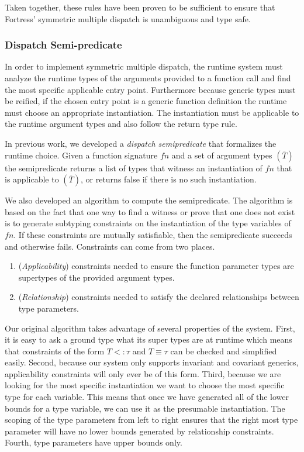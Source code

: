 \documentclass[preprint]{sigplanconf}
\begin{document}
Taken together, these rules have been proven to be sufficient to ensure that Fortress' symmetric multiple dispatch
is unambiguous and type safe.

\subsubsection{Dispatch Semi-predicate}
In order to implement symmetric multiple dispatch, the runtime system must analyze
the runtime types of the arguments provided to a function call and find the most
specific applicable entry point.  Furthermore because generic types must be reified, if the chosen entry point
is a generic function definition the runtime must choose an appropriate instantiation.  The instantiation
must be applicable to the runtime argument types and also follow the return type rule. 

In previous work, we 
developed a {\it dispatch semipredicate} that formalizes the runtime choice.  
Given a function signature $fn$ and a set of argument types $(\overline{T})$ the semipredicate 
returns a list of types that witness an instantiation of $fn$ that is applicable to $(\overline{T})$, or returns false
if there is no such instantiation.

We also developed an algorithm to compute the semipredicate.  The algorithm is based on the fact that  one 
way to find a witness or prove that one does not exist is to generate subtyping constraints on the 
instantiation of the type variables of $fn$.  If these constraints are mutually satisfiable, then the semipredicate 
succeeds and otherwise fails.  Constraints can come from two places.

\begin{enumerate}
\item ({\it Applicability}) constraints needed to ensure the function parameter types are supertypes of the 
	provided argument types.
\item ({\it Relationship}) constraints needed to satisfy the declared relationships between type parameters.
\end{enumerate}

Our original algorithm takes advantage of several properties of the system.  First, it is easy to ask a ground type what
its super types are at runtime which means that constraints of the form $T <: \tau$ and $T \equiv \tau$ can be 
checked and simplified easily.  Second, because our system only supports invariant and covariant generics,
applicability constraints will only ever be of this form.  Third, because we are looking for the most specific instantiation
we want to choose the most specific type for each variable.  This means that once we have generated all of the
lower bounds for a type variable, we can use it as the presumable instantiation.  The scoping of the type parameters
from left to right ensures that the right most type parameter will have no lower bounds generated by relationship
constraints.  Fourth, type parameters have upper bounds only.
\end{document}
